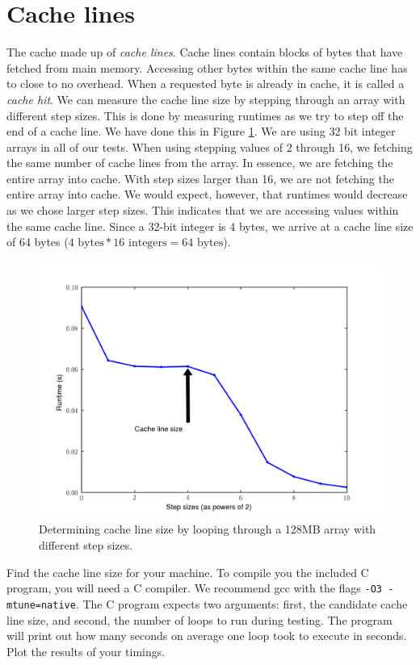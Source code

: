 \section*{Cache lines}
The cache made up of \emph{cache lines}.
Cache lines contain blocks of bytes that have fetched from main memory.
Accessing other bytes within the same cache line has to close to no overhead.
When a requested byte is already in cache, it is called a \emph{cache hit}.
We can measure the cache line size by stepping through an array with different step sizes.
This is done by measuring runtimes as we try to step off the end of a cache line.
We have done this in Figure \ref{fig:linesize}.  We are using 32 bit integer arrays in all of our tests.
When using stepping values of 2 through 16, we fetching the same number of cache lines from the array.
In essence, we are fetching the entire array into cache.
With step sizes larger than 16, we are not fetching the entire array into cache.
We would expect, however, that runtimes would decrease as we chose larger step sizes.
This indicates that we are accessing values within the same cache line.
Since a 32-bit integer is 4 bytes, we arrive at a cache line size of 64 bytes ($4 \mbox{~bytes} * 16 \mbox{~integers} = 64 \mbox{~bytes}$).
\begin{figure}[h]
\centering
\includegraphics[width=\textwidth]{cache_line.pdf}
\caption{Determining cache line size by looping through a 128MB array with different step sizes.}
\label{fig:linesize}
\end{figure}

\begin{problem}
Find the cache line size for your machine.
To compile you the included C program, you will need a C compiler.
We recommend gcc with the flags \texttt{-O3 -mtune=native}.
The C program expects two arguments: first, the candidate cache line size, and second, the number of loops to run during testing.
The program will print out how many seconds on average one loop took to execute in seconds.
Plot the results of your timings.
\label{prob:cacheline}
\end{problem}

